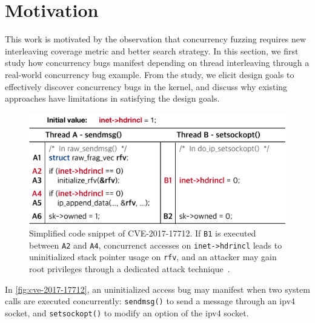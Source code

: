 \section{Motivation}
\label{s:motivation}


This work is motivated by the observation that concurrency fuzzing
requires new interleaving coverage metric and better search strategy.
In this section, we first study how concurrency bugs manifest
depending on thread interleaving through a real-world concurrency bug
example.
%
From the study, we elicit design goals to effectively discover concurrency
bugs in the kernel, and discuss why existing approaches have limitations 
in satisfying the design goals.

%

%
\begin{figure}[t]
  \centering
  \includegraphics[width=0.85\linewidth]{fig/cve-2017-10661.pdf}
  \caption{Simplified code snippet of CVE-2017-17712. If \texttt{B1}
    is executed between \texttt{A2} and \texttt{A4}, concurrenct
    accesses on \texttt{inet->hdrincl} leads to uninitialized stack
    pointer usage on \texttt{rfv}, and an attacker may gain root
    privileges through a dedicated attack
    technique~\cite{stackspray}.}
  \label{fig:cve-2017-17712}
\end{figure}
%
In \autoref{fig:cve-2017-17712}, an uninitialized access bug may
manifest when two system calls are executed concurrently:
\texttt{sendmsg()} to send a message through an ipv4 socket, and
\texttt{setsockopt()} to modify an option of the ipv4 socket.

